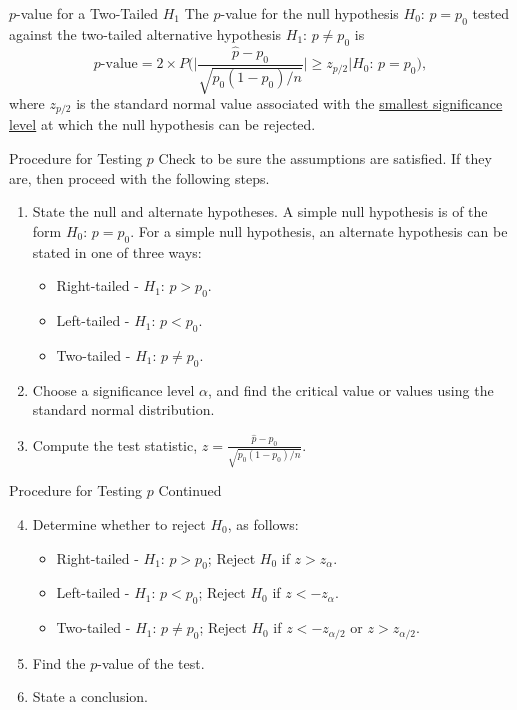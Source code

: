 \documentclass[pdf]{beamer}
\theoremstyle{remark}
\theoremstyle{definition}
\begin{document}
\begin{frame}[t]{$p$-value for a Two-Tailed $H_1$}
The $p$-value for the null hypothesis $H_0\text{: }  p = p_0$ tested against the two-tailed alternative hypothesis $H_1\text{: }  p \neq p_0$ is
\begin{equation}
p\text{-value} = 2 \times P\bigg( \bigg| \frac{\hat{p} - p_0}{\sqrt{p_0(1-p_0)/ n}} \bigg| \geq z_{p/2} | H_0\text{: }  p = p_0 \bigg),
\end{equation}
where $z_{p/2}$ is the standard normal value associated with the \underline{smallest significance level} at which the null hypothesis can be rejected.
\end{frame}

\begin{frame}[t]{Procedure for Testing $p$ }
Check to be sure the assumptions are satisfied. If they are, then proceed with the following steps. \\
\vspace{1.5ex}
\begin{enumerate}
\item State the null and alternate hypotheses. A simple null hypothesis is of the form $H_0\text{: }  p = p_0$. For a simple null hypothesis, an alternate hypothesis can be stated in one of three ways:
 \begin{itemize}
  \item Right-tailed - $H_1\text{: }  p > p_0$.
  \item Left-tailed - $H_1\text{: }  p < p_0$.
  \item Two-tailed - $H_1\text{: }  p \ne p_0$.
\end{itemize}
\item Choose a significance level $\alpha$, and find the critical value or values using the standard normal distribution.
\item Compute the test statistic, $z =\frac{\hat{p} - p_0}{\sqrt{p_0(1-p_0)/ n}}$.  
\end{enumerate}
\end{frame}

\begin{frame}[t]{Procedure for Testing $p$ Continued}
\begin{enumerate}
  \setcounter{enumi}{3}
\item Determine whether to reject $H_0$, as follows:
 \begin{itemize}
  \item Right-tailed - $H_1\text{: }  p > p_0$; Reject $H_0$ if $z > z_{\alpha}$.
  \item Left-tailed - $H_1\text{: }  p < p_0$; Reject $H_0$ if $z < -z_{\alpha}$.
  \item Two-tailed - $H_1\text{: }  p \ne p_0$; Reject $H_0$ if $z < -z_{\alpha/2}$ or $z > z_{\alpha/2}$.
\end{itemize}
\item Find the $p$-value of the test. 
\item State a conclusion.
\end{enumerate}
\end{frame}
\end{document}
